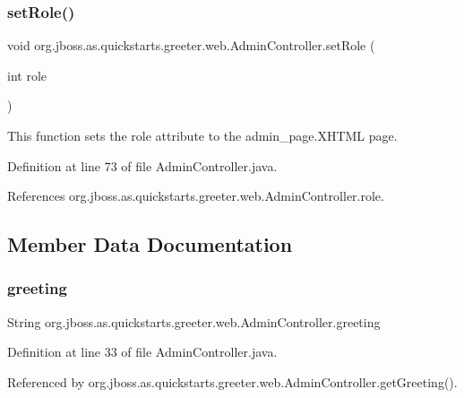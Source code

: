 \subsubsection{\texorpdfstring{set\+Role()}{setRole()}}
{\footnotesize\ttfamily void org.\+jboss.\+as.\+quickstarts.\+greeter.\+web.\+Admin\+Controller.\+set\+Role (\begin{DoxyParamCaption}\item[{int}]{role }\end{DoxyParamCaption})}



This function sets the role attribute to the admin\+\_\+page.\+X\+H\+T\+ML page. 



Definition at line 73 of file Admin\+Controller.\+java.



References org.\+jboss.\+as.\+quickstarts.\+greeter.\+web.\+Admin\+Controller.\+role.



\subsection{Member Data Documentation}
\mbox{\label{classorg_1_1jboss_1_1as_1_1quickstarts_1_1greeter_1_1web_1_1_admin_controller_af21c260f516d66bf87abed8c522fc070}} 
\subsubsection{\texorpdfstring{greeting}{greeting}}
{\footnotesize\ttfamily String org.\+jboss.\+as.\+quickstarts.\+greeter.\+web.\+Admin\+Controller.\+greeting\hspace{0.3cm}{\ttfamily [private]}}



Definition at line 33 of file Admin\+Controller.\+java.



Referenced by org.\+jboss.\+as.\+quickstarts.\+greeter.\+web.\+Admin\+Controller.\+get\+Greeting().

